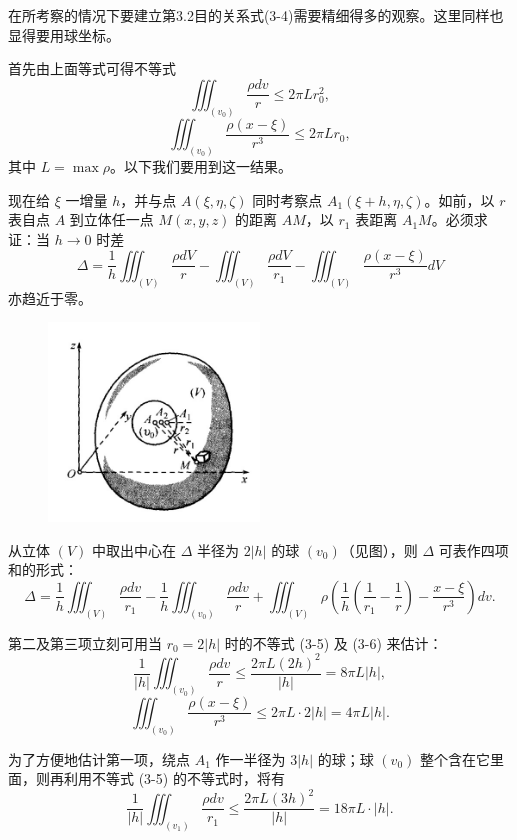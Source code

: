 \documentclass[12pt]{ctexart}
\begin{document}
在所考察的情况下要建立第3.2目的关系式(3-4)需要精细得多的观察。这里同样也显得要用球坐标。

首先由上面等式可得不等式
\[
\iiint_{(v_0)} \frac{\rho dv}{r} \leq 2\pi Lr_0^2, \tag{3-5}
\]
\[
\iiint_{(v_0)} \frac{\rho(x - \xi)}{r^3} \leq 2\pi Lr_0, \tag{3-6}
\]
其中 $L = \max \rho$。以下我们要用到这一结果。

现在给 $\xi$ 一增量 $h$，并与点 $A(\xi, \eta, \zeta)$ 同时考察点 $A_1(\xi + h, \eta, \zeta)$。如前，以 $r$ 表自点 $A$ 到立体任一点 $M(x, y, z)$ 的距离 $AM$，以 $r_1$ 表距离 $A_1M$。必须求证：当 $h \to 0$ 时差
\[
\Delta = \frac{1}{h} \iiint_{(V)} \frac{\rho dV}{r} - \iiint_{(V)} \frac{\rho dV}{r_1} - \iiint_{(V)} \frac{\rho(x - \xi)}{r^3} dV
\]
亦趋近于零。

\begin{figure}[h!] %
    \centering %
    \includegraphics[width=0.5\textwidth]{part3.jpg} %
\end{figure}

从立体 $(V)$ 中取出中心在 $\Delta$ 半径为 $2|h|$ 的球 $(v_0)$（见图），则 $\Delta$ 可表作四项和的形式：
\[
\Delta = \frac{1}{h} \iiint_{(V)} \frac{\rho dv}{r_1} - \frac{1}{h} \iiint_{(v_0)} \frac{\rho dv}{r} + \iiint_{(V)} \rho \left( \frac{1}{h} \left( \frac{1}{r_1} - \frac{1}{r} \right) - \frac{x - \xi}{r^3} \right) dv.
\]

第二及第三项立刻可用当 $r_0 = 2|h|$ 时的不等式 (3-5) 及 (3-6) 来估计：
\[
\frac{1}{|h|} \iiint_{(v_0)} \frac{\rho dv}{r} \leq \frac{2\pi L (2h)^2}{|h|} = 8\pi L |h|,
\]
\[
\iiint_{(v_0)} \frac{\rho(x - \xi)}{r^3} \leq 2\pi L \cdot 2|h| = 4\pi L |h|.
\]

为了方便地估计第一项，绕点 $A_1$ 作一半径为 $3|h|$ 的球；球 $(v_0)$ 整个含在它里面，则再利用不等式 (3-5) 的不等式时，将有
\[
\frac{1}{|h|} \iiint_{(v_1)} \frac{\rho dv}{r_1} \leq \frac{2\pi L (3h)^2}{|h|} = 18\pi L \cdot |h|.
\]
\end{document}

